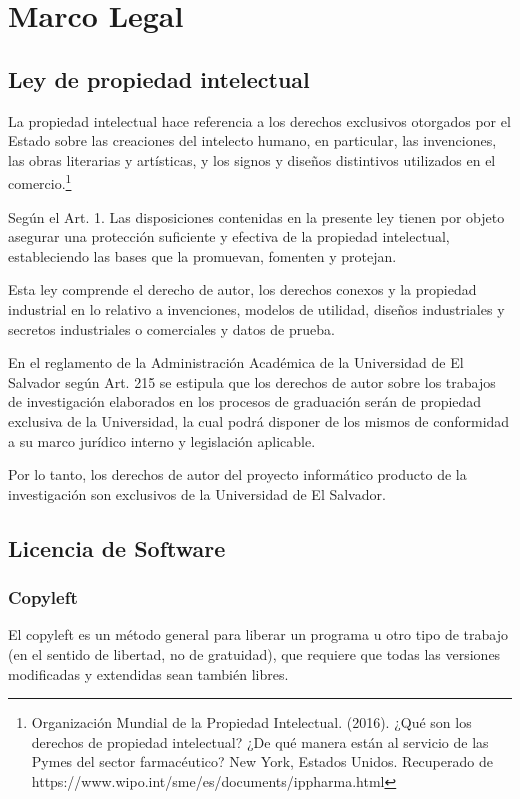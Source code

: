 \documentclass[12pt]{report}%
\begin{document}
\section{Marco Legal}
\subsection{Ley de propiedad intelectual}
La propiedad intelectual hace referencia a los derechos exclusivos otorgados por el Estado sobre las creaciones del intelecto humano, en particular, las invenciones, las obras literarias y artísticas, y los signos y diseños distintivos utilizados en el comercio.\footnote{Organización Mundial de la Propiedad Intelectual. (2016). ¿Qué son los derechos de propiedad intelectual? ¿De qué manera están al servicio de las Pymes del sector farmacéutico? New York, Estados Unidos. Recuperado de https://www.wipo.int/sme/es/documents/ippharma.html}

Según el Art. 1. Las disposiciones contenidas en la presente ley tienen por objeto asegurar una protección suficiente y efectiva de la propiedad intelectual, estableciendo las bases que la promuevan, fomenten y protejan.

Esta ley comprende el derecho de autor, los derechos conexos y la propiedad industrial en lo relativo a invenciones, modelos de utilidad, diseños industriales y secretos industriales o comerciales y datos de prueba.

En el reglamento de la Administración Académica de la Universidad de El Salvador según Art. 215 se estipula que los derechos de autor sobre los trabajos de investigación elaborados en los procesos de graduación serán de propiedad exclusiva de la Universidad, la cual podrá disponer de los mismos de conformidad a su marco jurídico interno y legislación aplicable.

Por lo tanto, los derechos de autor del proyecto informático producto de la investigación son exclusivos de la Universidad de El Salvador.


\subsection{Licencia de Software}
\subsubsection{Copyleft}
El copyleft es un método general para liberar un programa u otro tipo de trabajo (en el sentido de libertad, no de gratuidad), que requiere que todas las versiones modificadas y extendidas sean también libres.
\end{document}
